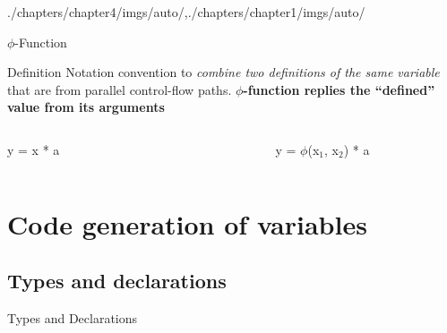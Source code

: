 \begin{graphicspathcontext}{{./chapters/chapter4/imgs/auto/},{./chapters/chapter1/imgs/auto/}}
\begin{bibunit}[apalike]
\begin{frame}{$\phi$-Function}
	\begin{definitionblock}{Definition}
		Notation convention to \emph{combine two definitions of the same variable} that are from parallel control-flow paths. \newline
		\textbf{$\phi$-function replies the ``defined'' value from its arguments}
	\end{definitionblock}
	\begin{example}
		\begin{columns}
			\begin{column}{.3\linewidth}
				\begin{myalgorithm}
					y = x * a
				\end{myalgorithm}
			\end{column}
			\begin{column}{.1\linewidth}
				\pgfuseimage{right-arrow}
			\end{column}
			\begin{column}{.3\linewidth}
				\begin{myalgorithm}
					\lIf{flag}{x$_1$ = -1}
					\lElse{x$_2$ = 1}
					y = $\phi$(x$_1$, x$_2$) * a
				\end{myalgorithm}
			\end{column}
		\end{columns}
	\end{example}
\end{frame}

\section[Generation of variables]{Code generation of variables}

\subsection{Types and declarations}
\subsectiontableofcontentslide*

\begin{frame}{Types and Declarations}
	\vspace{.25cm}
	\begin{center}
		\hspace{1cm}
	\end{center}
\end{frame}


\end{bibunit}
\end{graphicspathcontext}

